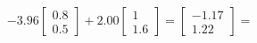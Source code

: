 \documentclass[preview]{standalone}
\begin{document}
\begin{align*}
-3.96 \begin{bmatrix} 0.8 \\ 0.5 \end{bmatrix} + 2.00 \begin{bmatrix} 1 \\ 1.6 \end{bmatrix} = \begin{bmatrix} -1.17 \\ 1.22 \end{bmatrix} =
\end{align*}
\end{document}
